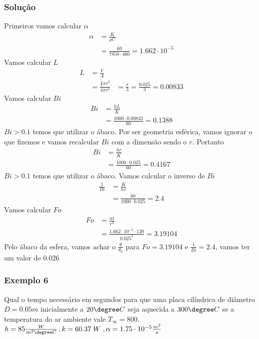 \subsubsection{Solução}
Primeiros vamos calcular \(\alpha \)
\begin{align}
    \alpha &= \frac{K}{\rho C}\\
    &= \frac{60}{7850 \cdot 460} = 1.662 \cdot 10^{-5}
\end{align}
Vamos calcular \(L\)
\begin{align}
    L &= \frac{V}{A}\\
    &= \frac{\frac{4}{3} \pi r ^{3}  }{4 \pi r^{2} }
    &= \frac{r}{3} = \frac{0.025}{3} = 0.00833 
\end{align}
Vamos calcular \(Bi\)
\begin{align}
    Bi &= \frac{h L}{K}\\
    &= \frac{1000 \cdot 0.00833}{60} = 0.1388
\end{align}
\(Bi > 0.1\) temos que utilizar o ábaco. Por ser geometria esférica, vamos ignorar o que fizemos e
vamos recalcular \(Bi\) com a dimensão sendo o \(r\). Portanto
\begin{align}
    Bi &= \frac{h r}{K}\\
    &= \frac{1000 \cdot 0.025}{60} = 0.4167
\end{align}
\(Bi > 0.1\) temos que utilizar o ábaco. Vamos calcular o inverso de \(Bi\)
\begin{align}
    \frac{1}{Bi} &= \frac{K}{h r}\\
    &= \frac{60}{1000 \cdot 0.025} = 2.4
\end{align}
Vamos calcular \(Fo\)
\begin{align}
    Fo &= \frac{\alpha t}{r^{2} }\\
    &= \frac{1.662 \cdot 10^{-5} \cdot 120}{0.025^{2} } = 3.19104
\end{align}
Pelo ábaco da esfera, vamos achar o \(\frac{\theta}{\theta _0}\) para \(Fo = 3.19104\) e
\(\frac{1}{Bi} = 2.4\), vamos ter um valor de \(0.026\)  
\subsubsection{Exemplo 6 }
Qual o tempo necessário em segundos para que uma placa cilíndrica de diâmetro \(D = 0.05 m\)
inicialmente a \(20 \degree C\) seja aquecida a \(300 \degree C\) se a temperatura do ar ambiente
vale \(T_{\infty} =800\). \(h = 85 \frac{W}{m^{2} \degree C}\,, k= 60.37 \; W \;, \alpha = 1.75 \cdot 10^{-5} \frac{m^2}{s} \)
